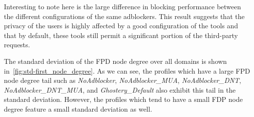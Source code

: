 \documentclass[compsoc, conference, letterpaper, 10pt, times]{IEEEtran}
\begin{document}
Interesting to note here is the large difference in blocking performance between the different configurations of the same adblockers. This result suggests that the privacy of the users is highly affected by a good configuration of the tools and that by default, these tools still permit a significant portion of the third-party requests.

The standard deviation of the FPD node degree over all domains is shown in~\ref{fig:std-first_node_degree}. As we can see, the profiles which have a large FPD node degree tail such as \textit{NoAdblocker}, \textit{NoAdblocker\_MUA}, \textit{NoAdblocker\_DNT}, \textit{NoAdblocker\_DNT\_MUA}, and \textit{Ghostery\_Default} also exhibit this tail in the standard deviation. However, the profiles which tend to have a small FDP node degree feature a small standard deviation as well.










\end{document}
